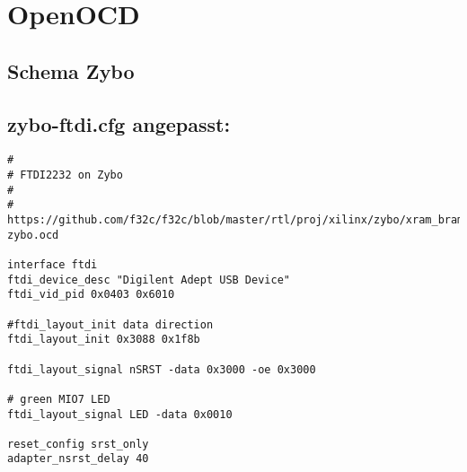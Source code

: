 \section{OpenOCD}

\subsection{Schema Zybo}
\label{anhang:schemaZybo}




\subsection{zybo-ftdi.cfg angepasst:}
\label{anhang:zybo-ftdi.cfg}
\lstset{language=tcl}
\begin{lstlisting}
#
# FTDI2232 on Zybo
#
#  https://github.com/f32c/f32c/blob/master/rtl/proj/xilinx/zybo/xram_bram_hdmi_ise/ftdi-zybo.ocd 

interface ftdi
ftdi_device_desc "Digilent Adept USB Device"
ftdi_vid_pid 0x0403 0x6010

#ftdi_layout_init data direction
ftdi_layout_init 0x3088 0x1f8b

ftdi_layout_signal nSRST -data 0x3000 -oe 0x3000

# green MIO7 LED
ftdi_layout_signal LED -data 0x0010

reset_config srst_only
adapter_nsrst_delay 40
\end{lstlisting}


